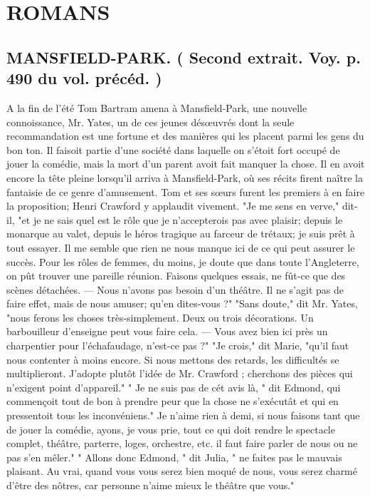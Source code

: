 \setcounter{page}{101}
\chapter{ROMANS}
\section{MANSFIELD-PARK. \large{( Second extrait. Voy. p. 490 du vol. précéd. )}}
A la fin de l'été Tom Bartram amena à Mansfield-Park, une nouvelle connoissance, Mr. Yates, un de ces jeunes désœuvrés dont la seule recommandation est une fortune et des manières qui les placent parmi les gens du bon ton. Il faisoit partie d'une société dans laquelle on s'étoit fort occupé de jouer la comédie, mais la mort d'un parent avoit fait manquer la chose. Il en avoit encore la\setcounter{page}{102} tête pleine lorsqu'il arriva à Mansfield-Park, où ses récits firent naître la fantaisie de ce genre d'amusement. Tom et ses sœurs furent les premiers à en faire la proposition; Henri Crawford y applaudit vivement.
"Je me sens en verve," dit-il, "et je ne sais quel est le rôle que je n'accepterois pas avec plaisir; depuis le monarque au valet, depuis le héros tragique au farceur de trétaux; je suis prêt à tout essayer. Il me semble que rien ne nous manque ici de ce qui peut assurer le succès. Pour les rôles de femmes, du moins, je doute que dans toute l'Angleterre, on pût trouver une pareille réunion. Faisons quelques essais, ne fût-ce que des scènes détachées. — Nous n'avons pas besoin d'un théâtre. Il ne s'agit pas de faire effet, mais de nous amuser; qu'en dites-vous ?"
"Sans doute," dit Mr. Yates, "nous ferons les choses très-simplement. Deux ou trois décorations. Un barbouilleur d'enseigne peut vous faire cela. — Vous avez bien ici près un charpentier pour l'échafaudage, n'est-ce pas ?"
"Je crois," dit Marie, "qu'il faut nous contenter à moins encore. Si nous mettons des retards, les difficultés se multiplieront. J'adopte plutôt l'idée de Mr. Crawford ;\setcounter{page}{103} cherchons des pièces qui n'exigent point d'appareil."
" Je ne suis pas de cét avis là, " dit Edmond, qui commençoit tout de bon à prendre peur que la chose ne s'exécutât et qui en pressentoit tous les inconvéniens." Je n'aime rien à demi, si nous faisons tant que de jouer la comédie, ayons, je vous prie, tout ce qui doit rendre le spectacle complet, théâtre, parterre, loges, orchestre, etc. il faut faire parler de nous ou ne pas s'en mêler."
" Allons donc Edmond, " dit Julia, " ne faites pas le mauvais plaisant. Au vrai, quand vous vous serez bien moqué de nous, vous serez charmé d'être des nôtres, car personne n'aime mieux le théâtre que vous."
